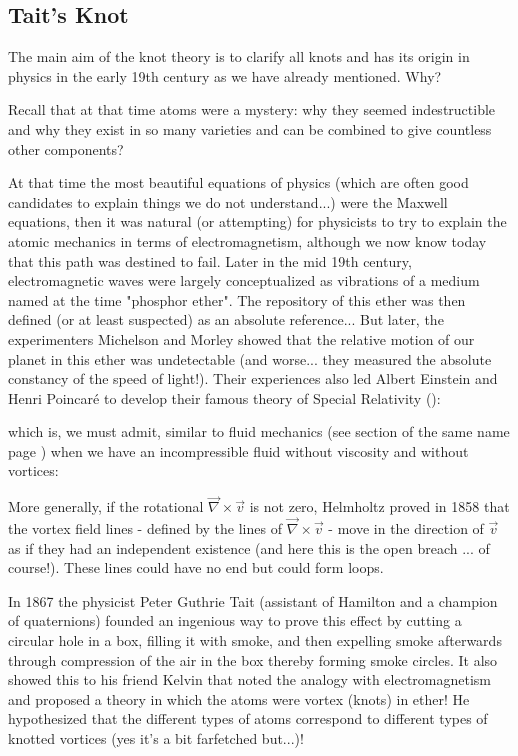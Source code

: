 {	\subsection{Tait's Knot}
	The main aim of the knot theory is to clarify all knots and has its origin in physics in the early 19th century as we have already mentioned. Why?
	
	Recall that at that time atoms were a mystery: why they seemed indestructible and why they exist in so many varieties and can be combined to give countless other components?
	
	At that time the most beautiful equations of physics (which are often good candidates to explain things we do not understand...) were the Maxwell equations, then it was natural (or attempting) for physicists to try to explain the atomic mechanics in terms of electromagnetism, although we now know today that this path was destined to fail. Later in the mid 19th century, electromagnetic waves were largely conceptualized as vibrations of a medium named at the time "phosphor ether". The repository of this ether was then defined (or at least suspected) as an absolute reference... But later, the experimenters Michelson and Morley showed that the relative motion of our planet in this ether was undetectable (and worse... they measured the absolute constancy of the speed of light!). Their experiences also led Albert Einstein and Henri Poincaré to develop their famous theory of Special Relativity ():
	
	which is, we must admit, similar to fluid mechanics (see section of the same name page \pageref{fluid mechanics}) when we have an incompressible fluid without viscosity and without vortices:
	
	More generally, if the rotational $\vec{ \nabla}\times \vec{v}$ is not zero, Helmholtz proved in 1858 that the vortex field lines - defined by the lines of $\vec{ \nabla}\times \vec{v}$ - move in the direction of $\vec{v}$ as if they had an independent existence (and here this is the open breach ... of course!). These lines could have no end but could form loops.
	
	In 1867 the physicist Peter Guthrie Tait (assistant of Hamilton and a champion of quaternions) founded an ingenious way to prove this effect by cutting a circular hole in a box, filling it with smoke, and then expelling smoke afterwards through compression of the air in the box thereby forming smoke circles. It also showed this to his friend Kelvin that noted the analogy with electromagnetism and proposed a theory in which the atoms were vortex (knots) in ether! He hypothesized that the different types of atoms correspond to different types of knotted vortices (yes it's a bit farfetched but...)!
	
}
